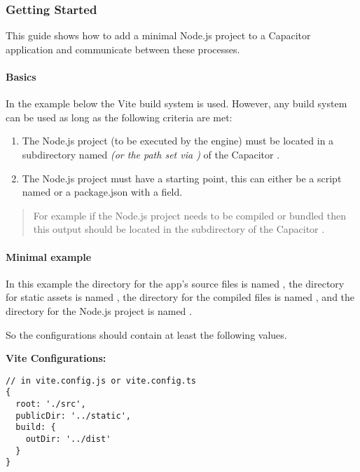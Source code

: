 \subsubsection{Getting Started}
\label{sec:Capacitor-NodeJS:GettingStarted}

This guide shows how to add a minimal Node.js project to a Capacitor application and communicate between these processes.

\paragraph{Basics}
\label{sec:Capacitor-NodeJS:Basics}

In the example below the Vite build system is used.
However, any build system can be used as long as the following criteria are met:

\begin{enumerate}
  \item The Node.js project (to be executed by the engine) must be located in a subdirectory named  \textit{(or the path set via )} of the Capacitor .
  \item The Node.js project must have a starting point, this can either be a script named  or a package.json with a  field.
\end{enumerate}

\begin{quote}
  For example if the Node.js project needs to be compiled or bundled then this output should be located in the subdirectory of the Capacitor .
\end{quote}

\newpage

\paragraph{Minimal example}
\label{sec:Capacitor-NodeJS:MinimalExample}

In this example the directory for the app's source files is named , the directory for static assets is named ,
the directory for the compiled files is named , and the directory for the Node.js project is named .

So the configurations should contain at least the following values.~\cite{vite, capacitor:docs}

\textbf{Vite Configurations:}

\begin{verbatim}
// in vite.config.js or vite.config.ts
{
  root: './src',
  publicDir: '../static',
  build: {
    outDir: '../dist'
  }
}
\end{verbatim}

